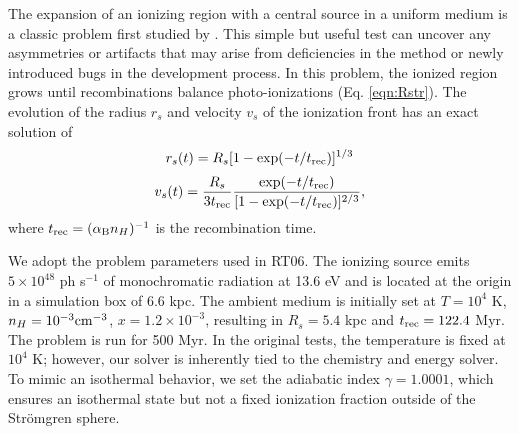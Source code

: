 \documentclass[apj,onecolumn]{emulateapj}
\begin{document}
The expansion of an ionizing region with a central source in a uniform
medium is a classic problem first studied by \citet{Stroemgren39}.
This simple but useful test can uncover any asymmetries or artifacts
that may arise from deficiencies in the method or newly introduced
bugs in the development process.  In this problem, the ionized region
grows until recombinations balance photo-ionizations
(Eq. \ref{eqn:Rstr}).  The evolution of the radius $r_s$ and velocity
$v_s$ of the ionization front has an exact solution of
%
\begin{equation}
  \label{eqn:rstr}
  r_s(t) = R_s [ 1 - \exp(-t/t_{\rm rec}) ]^{1/3}
\end{equation}
\begin{equation}
  \label{eqn:vstr}
  v_s(t) = \frac{R_s}{3t_{\rm rec}} \frac{\exp(-t/t_{\rm rec})} {[1 -
    \exp(-t/t_{\rm rec})]^{2/3}},
\end{equation}
where $t_{\rm rec} = (\alpha_{\rm B} n_H)^{-1}$ is the recombination
time.

We adopt the problem parameters used in RT06.  The ionizing
source emits $5 \times 10^{48}$ ph s$^{-1}$ of monochromatic radiation
at 13.6 eV and is located at the origin in a simulation box of 6.6
kpc.  The ambient medium is initially set at $T=10^4$ K, $n_H =
10^{-3} \cubecm$, $x = 1.2 \times 10^{-3}$, resulting in $R_s = 5.4$
kpc and $t_{\rm rec} = 122.4$ Myr.  The problem is run for 500 Myr.
In the original tests, the temperature is fixed at $10^4$ K; however,
our solver is inherently tied to the chemistry and energy solver.  To
mimic an isothermal behavior, we set the adiabatic index $\gamma =
1.0001$, which ensures an isothermal state but not a fixed ionization
fraction outside of the Str\"{o}mgren sphere.
\end{document}
